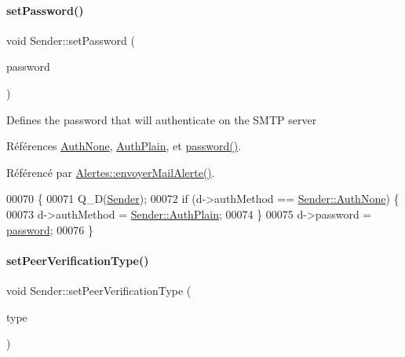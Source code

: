 \paragraph{\texorpdfstring{set\+Password()}{setPassword()}}
{\footnotesize\ttfamily void Sender\+::set\+Password (\begin{DoxyParamCaption}\item[{const Q\+String \&}]{password }\end{DoxyParamCaption})}

Defines the password that will authenticate on the S\+M\+TP server 

Références \hyperlink{class_simple_mail_1_1_sender_af50defb714bc3e95f47c71a9ba6ee6bba1dd1824451d663ee54b5a528cd8ced74}{Auth\+None}, \hyperlink{class_simple_mail_1_1_sender_af50defb714bc3e95f47c71a9ba6ee6bba28927645560285ef540f6f2471be4584}{Auth\+Plain}, et \hyperlink{class_simple_mail_1_1_sender_adc225693c32f66e746fec828a4da2bb6}{password()}.



Référencé par \hyperlink{class_alertes_a375783502a78109f3323dc1ed90cfdc9}{Alertes\+::envoyer\+Mail\+Alerte()}.


\begin{DoxyCode}
00070 \{
00071     Q\_D(\hyperlink{class_simple_mail_1_1_sender}{Sender});
00072     \textcolor{keywordflow}{if} (d->authMethod == \hyperlink{class_simple_mail_1_1_sender_af50defb714bc3e95f47c71a9ba6ee6bba1dd1824451d663ee54b5a528cd8ced74}{Sender::AuthNone}) \{
00073         d->authMethod = \hyperlink{class_simple_mail_1_1_sender_af50defb714bc3e95f47c71a9ba6ee6bba28927645560285ef540f6f2471be4584}{Sender::AuthPlain};
00074     \}
00075     d->password = \hyperlink{class_simple_mail_1_1_sender_adc225693c32f66e746fec828a4da2bb6}{password};
00076 \}
\end{DoxyCode}
\mbox{\label{class_simple_mail_1_1_sender_a5ca6eefacae85517e6ff45bfcd9fd0ba}} 
\paragraph{\texorpdfstring{set\+Peer\+Verification\+Type()}{setPeerVerificationType()}}
{\footnotesize\ttfamily void Sender\+::set\+Peer\+Verification\+Type (\begin{DoxyParamCaption}\item[{\hyperlink{class_simple_mail_1_1_sender_acfbcf388ab7c26cd41c5c77601fe8804}{Sender\+::\+Peer\+Verification\+Type}}]{type }\end{DoxyParamCaption})}


